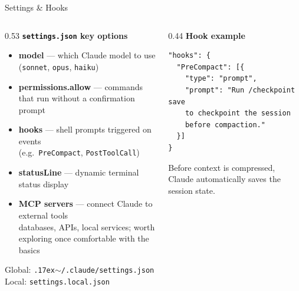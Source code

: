 \documentclass[aspectratio=169, 10pt]{beamer}
\begin{document}
\begin{frame}[fragile]{Settings \& Hooks}
  \begin{columns}[T]
    \begin{column}{0.53\textwidth}
      \textbf{\color{biokteal}\texttt{settings.json} key options}
      \begin{itemize}\setlength\itemsep{3pt}
        \item \textbf{model} --- which Claude model to use\\
              {\small (\texttt{sonnet}, \texttt{opus}, \texttt{haiku})}
        \item \textbf{permissions.allow} --- commands that run without a confirmation prompt\\
        \item \textbf{hooks} --- shell prompts triggered on events\\
              {\small (e.g.\ \texttt{PreCompact}, \texttt{PostToolCall})}
        \item \textbf{statusLine} --- dynamic terminal status display
        \item \textbf{MCP servers} --- connect Claude to external tools\\
              {\small databases, APIs, local services; worth exploring once comfortable with the basics}
      \end{itemize}
      \vspace{0.4em}
      {\small Global: \texttt{{\raise.17ex\hbox{$\scriptstyle\sim$}}/.claude/settings.json} \\ Local: \texttt{settings.local.json}}
    \end{column}
    \begin{column}{0.44\textwidth}
      \textbf{\color{biokteal}Hook example}
      \begin{lstlisting}
"hooks": {
  "PreCompact": [{
    "type": "prompt",
    "prompt": "Run /checkpoint save
    to checkpoint the session
    before compaction."
  }]
}
      \end{lstlisting}
      \vspace{0.3em}
      {\small Before context is compressed, Claude automatically saves the session state.}
    \end{column}
  \end{columns}
\end{frame}
\end{document}
